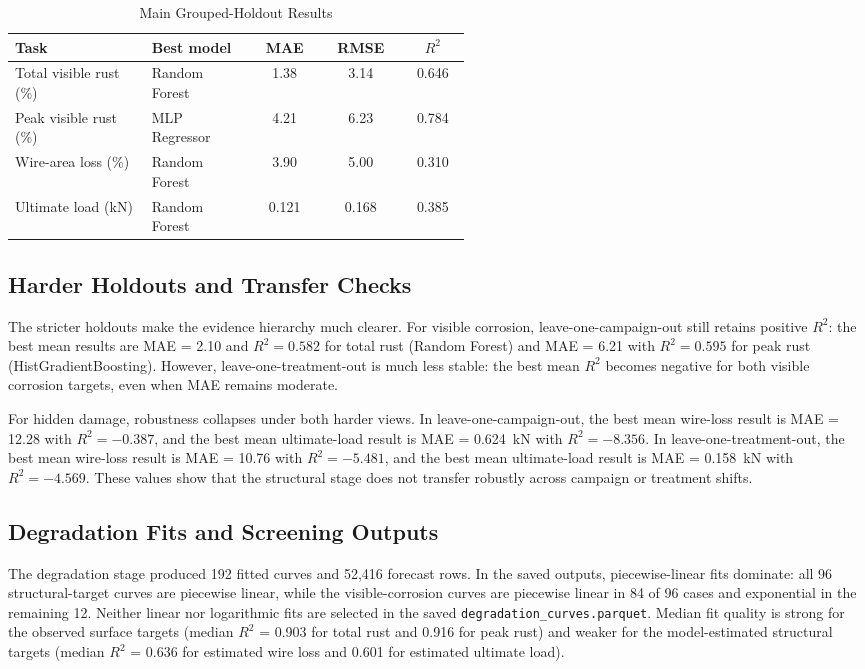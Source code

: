 \documentclass[conference]{IEEEtran}
\begin{document}
\begin{table}[t]
    \caption{Main Grouped-Holdout Results}
    \label{tab:grouped-results}
    \centering
    \scriptsize
    \setlength{\tabcolsep}{3pt}
    \begin{tabular}{@{}L{0.30\linewidth}L{0.23\linewidth}ccc@{}}
        \toprule
        Task & Best model & MAE & RMSE & $R^2$ \\
        \midrule
        Total visible rust (\%) & Random Forest & 1.38 & 3.14 & 0.646 \\
        Peak visible rust (\%) & MLP Regressor & 4.21 & 6.23 & 0.784 \\
        Wire-area loss (\%) & Random Forest & 3.90 & 5.00 & 0.310 \\
        Ultimate load (kN) & Random Forest & 0.121 & 0.168 & 0.385 \\
        \bottomrule
    \end{tabular}
\end{table}

\subsection{Harder Holdouts and Transfer Checks}
The stricter holdouts make the evidence hierarchy much clearer. For visible corrosion, leave-one-campaign-out still retains positive $R^2$: the best mean results are MAE = 2.10 and $R^2 = 0.582$ for total rust (Random Forest) and MAE = 6.21 with $R^2 = 0.595$ for peak rust (HistGradientBoosting). However, leave-one-treatment-out is much less stable: the best mean $R^2$ becomes negative for both visible corrosion targets, even when MAE remains moderate.

For hidden damage, robustness collapses under both harder views. In leave-one-campaign-out, the best mean wire-loss result is MAE = 12.28 with $R^2 = -0.387$, and the best mean ultimate-load result is MAE = 0.624~kN with $R^2 = -8.356$. In leave-one-treatment-out, the best mean wire-loss result is MAE = 10.76 with $R^2 = -5.481$, and the best mean ultimate-load result is MAE = 0.158~kN with $R^2 = -4.569$. These values show that the structural stage does not transfer robustly across campaign or treatment shifts.

\subsection{Degradation Fits and Screening Outputs}
The degradation stage produced 192 fitted curves and 52{,}416 forecast rows. In the saved outputs, piecewise-linear fits dominate: all 96 structural-target curves are piecewise linear, while the visible-corrosion curves are piecewise linear in 84 of 96 cases and exponential in the remaining 12. Neither linear nor logarithmic fits are selected in the saved \texttt{degradation\_curves.parquet}. Median fit quality is strong for the observed surface targets (median $R^2$ = 0.903 for total rust and 0.916 for peak rust) and weaker for the model-estimated structural targets (median $R^2$ = 0.636 for estimated wire loss and 0.601 for estimated ultimate load).
\end{document}

